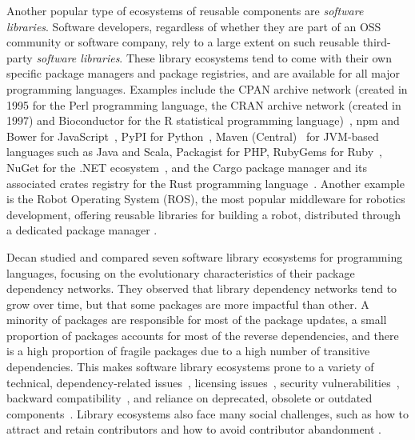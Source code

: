 
Another popular type of ecosystems of reusable components are \emph{software libraries}. Software developers, regardless of whether they are part of an OSS community or software company, rely to a large extent on such reusable third-party \emph{software libraries}. These library ecosystems tend to come with their own specific package managers and package registries, and are available for all major programming languages. Examples include the CPAN archive network (created in 1995 for the Perl programming language, the CRAN archive network (created in 1997) and Bioconductor for the R statistical programming language)~\cite{German2013,Plakidas2017-JSS},
npm %
and Bower for JavaScript~\cite{cogo2021deprecation, abdalkareem2017developers,decan2018evolution,decan2018impact,decan2021back,zerouali2022impact}, %
PyPI for Python~\cite{valiev2018ecosystem}, %
Maven (Central)~\cite{Benelallam2019,soto2021comprehensive,Ochoa2022-EMSE} for JVM-based languages such as Java and Scala,
Packagist for PHP,
RubyGems for Ruby~\cite{Kabbedijk2011,decan2021back,zerouali2022impact},
NuGet for the .NET ecosystem~\cite{Li2022-ICSE},
and the Cargo package manager and its associated crates registry for the Rust programming language~\cite{decan2018evolution,Schueller2022-Rust}.
Another example is the Robot Operating System (ROS), the most popular middleware for robotics development, offering reusable libraries for building a robot, distributed through a dedicated package manager \cite{Estefo2019,Pichler2019ROS,Kolak2020ROS}.


Decan \etal \cite{decan:emse:2019} studied and compared seven software library ecosystems for programming languages, focusing on the evolutionary characteristics of their package dependency networks.
They observed that library dependency networks tend to grow over time, but that some packages are more impactful than other.
A minority of packages are responsible for most of the package updates, a small proportion of packages accounts for most of the reverse dependencies, and there is a high proportion of fragile packages due to a high number of transitive dependencies.
This makes software library ecosystems prone to a variety of technical, dependency-related issues~\cite{decan2017empirical,abdalkareem2017developers,Claes2018,soto2021comprehensive}, licensing issues~\cite{2022:icsr:makari}, security vulnerabilities~\cite{decan2018impact,zerouali2022impact,Alfadel2021}, backward compatibility~\cite{decan2021what,decan2021back,bogart2021and}, and reliance on deprecated, obsolete or outdated components~\cite{cogo2021deprecation,decan2018evolution,zerouali2019formal,lauinger2018thou}.
Library ecosystems also face many social challenges, such as how to attract and retain contributors and how to avoid contributor abandonment \cite{Constantinou2017}.

